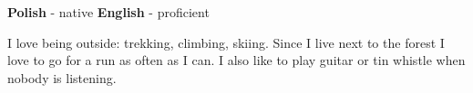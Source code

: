 \documentclass[9pt]{developercv} %
\begin{document}

\begin{minipage}[t]{0.3\textwidth}
	\vspace{-\baselineskip} %

	
	\textbf{Polish} - native \hspace{0.2cm} \textbf{English} - proficient
\end{minipage}
\hfill
\begin{minipage}[t]{0.7\textwidth}
	\vspace{-\baselineskip} %
	
	
	I love being outside: trekking, climbing, skiing. Since I live next to the forest I love to go for a run as often as I can. I also like to play guitar or tin whistle when nobody is listening.
\end{minipage}
\end{document}
